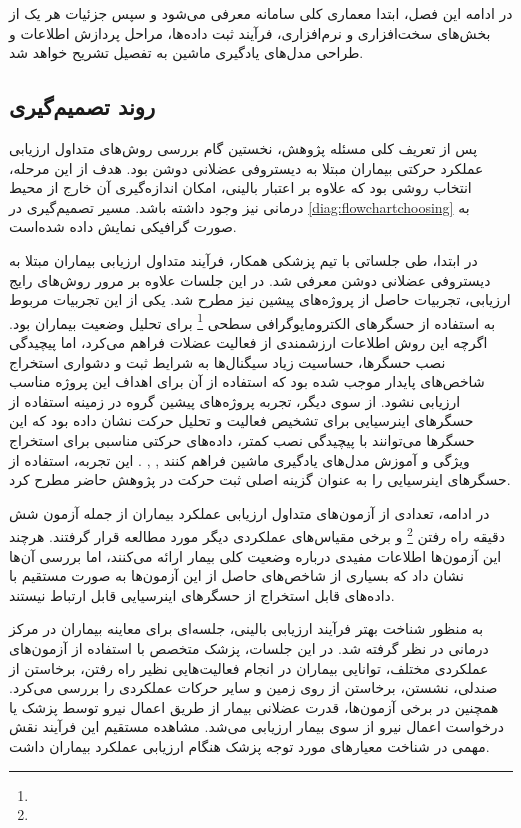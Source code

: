در ادامه این فصل، ابتدا معماری کلی سامانه معرفی می‌شود و سپس جزئیات هر یک از بخش‌های سخت‌افزاری و نرم‌افزاری، فرآیند ثبت داده‌ها، مراحل پردازش اطلاعات و طراحی مدل‌های یادگیری ماشین به تفصیل تشریح خواهد شد.

\subsection{روند تصمیم‌گیری }

پس از تعریف کلی مسئله پژوهش، نخستین گام بررسی روش‌های متداول ارزیابی عملکرد حرکتی بیماران مبتلا به دیستروفی عضلانی دوشن بود. هدف از این مرحله، انتخاب روشی بود که علاوه بر اعتبار بالینی، امکان اندازه‌گیری آن خارج از محیط درمانی نیز وجود داشته باشد. مسیر تصمیم‌گیری در
\autoref{diag:flowchartchoosing}
به صورت گرافیکی نمایش داده شده‌است.

در ابتدا، طی جلساتی با تیم پزشکی همکار، فرآیند متداول ارزیابی بیماران مبتلا به دیستروفی عضلانی دوشن معرفی شد. در این جلسات علاوه بر مرور روش‌های رایج ارزیابی، تجربیات حاصل از پروژه‌های پیشین نیز مطرح شد. یکی از این تجربیات مربوط به استفاده از حسگرهای الکترومایوگرافی سطحی
\footnote{}
برای تحلیل وضعیت بیماران بود. اگرچه این روش اطلاعات ارزشمندی از فعالیت عضلات فراهم می‌کرد، اما پیچیدگی نصب حسگرها، حساسیت زیاد سیگنال‌ها به شرایط ثبت و دشواری استخراج شاخص‌های پایدار موجب شده بود که استفاده از آن برای اهداف این پروژه مناسب ارزیابی نشود. از سوی دیگر، تجربه پروژه‌های پیشین گروه در زمینه استفاده از حسگرهای اینرسیایی برای تشخیص فعالیت و تحلیل حرکت نشان داده بود که این حسگرها می‌توانند با پیچیدگی نصب کمتر، داده‌های حرکتی مناسبی برای استخراج ویژگی و آموزش مدل‌های یادگیری ماشین فراهم کنند 
\cite{Partovi2023Thesis},
\cite{Ejtehadi2022Thesis},
\cite{Nasrabadi2019Thesis}.
 این تجربه، استفاده از حسگرهای اینرسیایی را به عنوان گزینه اصلی ثبت حرکت در پژوهش حاضر مطرح کرد.

در ادامه، تعدادی از آزمون‌های متداول ارزیابی عملکرد بیماران از جمله آزمون شش دقیقه راه رفتن
 \footnote{}
  و برخی مقیاس‌های عملکردی دیگر مورد مطالعه قرار گرفتند. هرچند این آزمون‌ها اطلاعات مفیدی درباره وضعیت کلی بیمار ارائه می‌کنند، اما بررسی آن‌ها نشان داد که بسیاری از شاخص‌های حاصل از این آزمون‌ها به صورت مستقیم با داده‌های قابل استخراج از حسگرهای اینرسیایی قابل ارتباط نیستند.

به منظور شناخت بهتر فرآیند ارزیابی بالینی، جلسه‌ای برای معاینه بیماران در مرکز درمانی در نظر گرفته شد. در این جلسات، پزشک متخصص با استفاده از آزمون‌های عملکردی مختلف، توانایی بیماران در انجام فعالیت‌هایی نظیر راه رفتن، برخاستن از صندلی، نشستن، برخاستن از روی زمین و سایر حرکات عملکردی را بررسی می‌کرد. همچنین در برخی آزمون‌ها، قدرت عضلانی بیمار از طریق اعمال نیرو توسط پزشک یا درخواست اعمال نیرو از سوی بیمار ارزیابی می‌شد. مشاهده مستقیم این فرآیند نقش مهمی در شناخت معیارهای مورد توجه پزشک هنگام ارزیابی عملکرد بیماران داشت.

